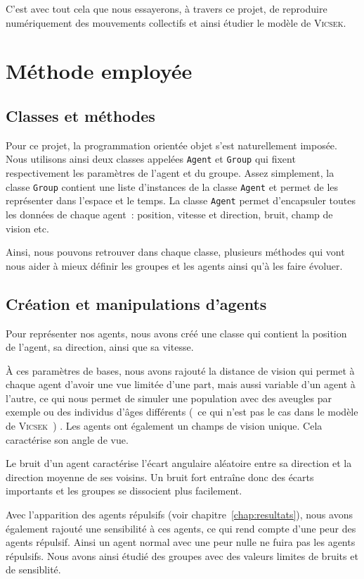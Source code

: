 \documentclass[french, a4paper, 12pt, openany]{report}
\begin{document}
	C'est avec tout cela que nous essayerons, à travers ce projet, de reproduire numériquement des mouvements collectifs et ainsi étudier le modèle de \textsc{Vicsek}.
	
\chapter{Méthode employée}
\section{Classes et méthodes}

    Pour ce projet, la programmation orientée objet s'est naturellement imposée. Nous utilisons ainsi deux classes appelées \verb|Agent| et \verb|Group| qui fixent respectivement les paramètres de l'agent et du groupe. Assez simplement, la classe \verb|Group| contient une liste d'instances de la classe \verb|Agent| et permet de les représenter dans l'espace et le temps. La classe \verb|Agent| permet d'encapsuler toutes les données de chaque agent~: position, vitesse et direction, bruit, champ de vision etc.
    
	Ainsi, nous pouvons retrouver dans chaque classe, plusieurs méthodes qui vont nous aider à mieux définir les groupes et les agents ainsi qu'à les faire évoluer. \\
  
\section{Création et manipulations d'agents}
	Pour représenter nos agents, nous avons créé une classe qui contient la position de l'agent, sa direction, ainsi que sa vitesse.
	
	À ces paramètres de bases, nous avons rajouté la distance de vision qui permet à chaque agent d'avoir une vue limitée d'une part, mais aussi variable d'un agent à l'autre, ce qui nous permet de simuler une population avec des aveugles par exemple ou des individus d'âges différents (~ce qui n'est pas le cas dans le modèle de \textsc{Vicsek}~) . Les agents ont également un champs de vision unique. Cela caractérise son angle de vue.  
	
	Le bruit d'un agent caractérise l'écart angulaire aléatoire entre sa direction et la direction moyenne de ses voisins. Un bruit fort entraîne donc des écarts importants et les groupes se dissocient plus facilement.
	
	Avec l'apparition des agents répulsifs (voir chapitre~\ref{chap:resultats}), nous avons également rajouté une sensibilité à ces agents, ce qui rend compte d'une peur des agents répulsif. Ainsi un agent normal avec une peur nulle ne fuira pas les agents répulsifs. Nous avons ainsi étudié des groupes avec des valeurs limites de bruits et de sensiblité.
	
\end{document}
